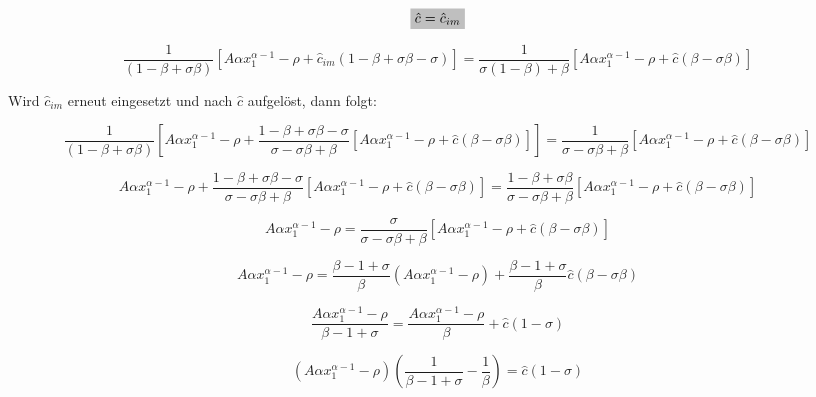 	\begin{equation*}
		\colorbox{lightgray}{$\hat{c}=\hat{c}_{im}$}
	\end{equation*}


	\begin{equation}
		\frac{1}{(1-\beta+\sigma\beta)}[A\alpha x_1^{\alpha-1}-\rho+\hat{c}_{im}(1-\beta+\sigma\beta-\sigma)]=\frac{1}{\sigma(1-\beta)+\beta}[A\alpha x_1^{\alpha-1}-\rho+\hat{c}(\beta-\sigma\beta)]
	\end{equation}


Wird $\hat{c}_{im}$ erneut eingesetzt und  nach $\hat{c}$ aufgelöst, dann folgt: 


	\begin{equation*}
		\frac{1}{(1-\beta+\sigma\beta)}\left[A\alpha x_1^{\alpha-1}-\rho+\frac{1-\beta+\sigma\beta-\sigma}{\sigma-\sigma\beta+\beta}[A\alpha x_1^{\alpha-1}-\rho+\hat{c}(\beta-\sigma\beta)]\right]=\frac{1}{\sigma-\sigma\beta+\beta}[A\alpha x_1^{\alpha-1}-\rho+\hat{c}(\beta-\sigma\beta)]
	\end{equation*}


	\begin{equation*}
		A\alpha x_1^{\alpha-1}-\rho+\frac{1-\beta+\sigma\beta-\sigma}{\sigma-\sigma\beta+\beta}[A\alpha x_1^{\alpha-1}-\rho+\hat{c}(\beta-\sigma\beta)]=\frac{1-\beta+\sigma\beta}{\sigma-\sigma\beta+\beta}[A\alpha x_1^{\alpha-1}-\rho+\hat{c}(\beta-\sigma\beta)]
	\end{equation*}


	\begin{equation*}
		A\alpha x_1^{\alpha-1}-\rho=\frac{\sigma}{\sigma-\sigma\beta+\beta}[A\alpha x_1^{\alpha-1}-\rho+\hat{c}(\beta-\sigma\beta)]
	\end{equation*}

	
	\begin{equation*}
		A\alpha x_1^{\alpha-1}-\rho=\frac{\beta-1+\sigma}{\beta}(A\alpha x_1^{\alpha-1}-\rho)+\frac{\beta-1+\sigma}{\beta}\hat{c}(\beta-\sigma\beta)
	\end{equation*}


	\begin{equation*}
		\frac{A\alpha x_1^{\alpha-1}-\rho}{\beta-1+\sigma}=\frac{A\alpha x_1^{\alpha-1}-\rho}{\beta}+\hat{c}(1-\sigma)
	\end{equation*}


	\begin{equation*}
		(A\alpha x_1^{\alpha-1}-\rho)\left(\frac{1}{\beta-1+\sigma}-\frac{1}{\beta}\right)=\hat{c}(1-\sigma)
	\end{equation*}

